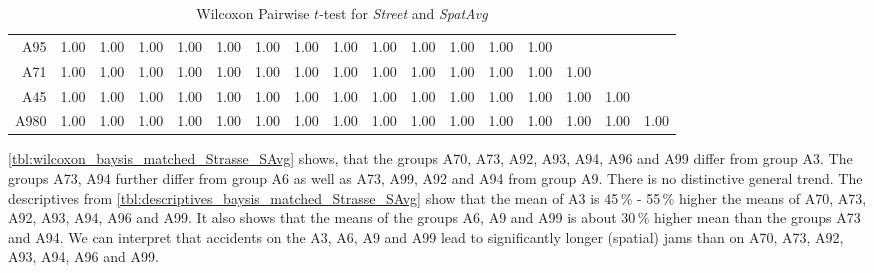 \begin{table}[ht]
\begin{tabular}{rrrrrrrrrrrrrrrrr}
	  	A95 & 1.00 & 1.00 & 1.00 & 1.00 & 1.00 & 1.00 & 1.00 & 1.00 & 1.00 & 1.00 & 1.00 & 1.00 & 1.00 &  &  &  \\ 
	  	A71 & 1.00 & 1.00 & 1.00 & 1.00 & 1.00 & 1.00 & 1.00 & 1.00 & 1.00 & 1.00 & 1.00 & 1.00 & 1.00 & 1.00 &  &  \\ 
	  	A45 & 1.00 & 1.00 & 1.00 & 1.00 & 1.00 & 1.00 & 1.00 & 1.00 & 1.00 & 1.00 & 1.00 & 1.00 & 1.00 & 1.00 & 1.00 &  \\ 
	  	A980 & 1.00 & 1.00 & 1.00 & 1.00 & 1.00 & 1.00 & 1.00 & 1.00 & 1.00 & 1.00 & 1.00 & 1.00 & 1.00 & 1.00 & 1.00 & 1.00 \\ 
		\bottomrule
	\end{tabular}
	\caption{Wilcoxon Pairwise $t$-test for \textit{Street} and \textit{SpatAvg}}
	\label{tbl:wilcoxon_baysis_matched_Strasse_SAvg}
\end{table}
\autoref{tbl:wilcoxon_baysis_matched_Strasse_SAvg} shows, that the groups A70, A73, A92, A93, A94, A96 and A99 differ from group A3. The groups A73, A94 further differ from group A6 as well as A73, A99, A92 and A94 from group A9. There is no distinctive general trend. The descriptives from \autoref{tbl:descriptives_baysis_matched_Strasse_SAvg} show that the mean of A3 is 45\,\% - 55\,\% higher the means of A70, A73, A92, A93, A94, A96 and A99. It also shows that the means of the groups A6, A9 and A99 is about 30\,\% higher mean than the groups A73 and A94. We can interpret that accidents on the A3, A6, A9 and A99 lead to significantly longer (spatial) jams than on A70, A73, A92, A93, A94, A96 and A99.
